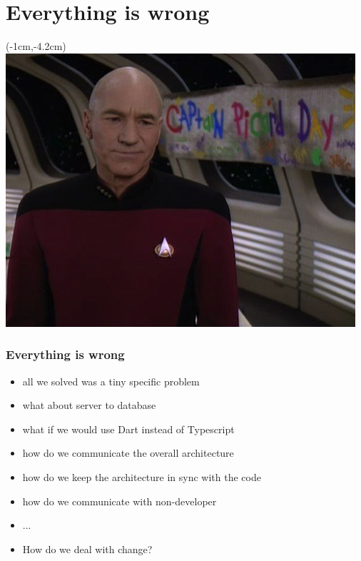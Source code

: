 \documentclass[xelatex,13pt]{beamer}
\begin{document}
\section{Everything is wrong}
\begin{frame}
\begin{textblock*}{0cm}(-1cm,-4.2cm)
	\includegraphics[width=1.0\paperwidth]{picarddday.jpg}
\end{textblock*}
\end{frame}

\begin{frame}
	\frametitle{Everything is wrong}
	\begin{itemize}
		\item all we solved was a tiny specific problem
		\item what about server to database
		\item what if we would use Dart instead of Typescript
		\item how do we communicate the overall architecture
		\item how do we keep the architecture in sync with the code
		\item how do we communicate with non-developer
		\item ...
		\pause
		\item {\huge How do we deal with change?}
	\end{itemize}
\end{frame}
\end{document}
